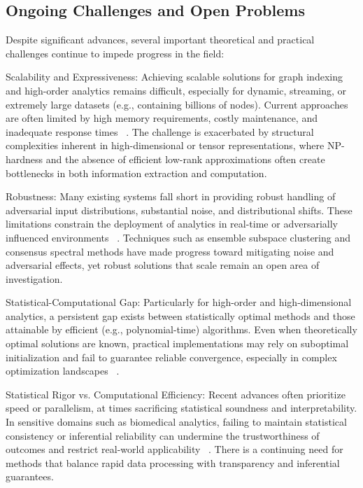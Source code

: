 \documentclass[sigconf]{acmart}
\begin{document}
\subsection{Ongoing Challenges and Open Problems}

Despite significant advances, several important theoretical and practical challenges continue to impede progress in the field:

Scalability and Expressiveness: Achieving scalable solutions for graph indexing and high-order analytics remains difficult, especially for dynamic, streaming, or extremely large datasets (e.g., containing billions of nodes). Current approaches are often limited by high memory requirements, costly maintenance, and inadequate response times ~\cite{ref104,ref107}. The challenge is exacerbated by structural complexities inherent in high-dimensional or tensor representations, where NP-hardness and the absence of efficient low-rank approximations often create bottlenecks in both information extraction and computation.

Robustness: Many existing systems fall short in providing robust handling of adversarial input distributions, substantial noise, and distributional shifts. These limitations constrain the deployment of analytics in real-time or adversarially influenced environments ~\cite{ref106}. Techniques such as ensemble subspace clustering and consensus spectral methods have made progress toward mitigating noise and adversarial effects, yet robust solutions that scale remain an open area of investigation.

Statistical-Computational Gap: Particularly for high-order and high-dimensional analytics, a persistent gap exists between statistically optimal methods and those attainable by efficient (e.g., polynomial-time) algorithms. Even when theoretically optimal solutions are known, practical implementations may rely on suboptimal initialization and fail to guarantee reliable convergence, especially in complex optimization landscapes ~\cite{ref104,ref110}.

Statistical Rigor vs. Computational Efficiency: Recent advances often prioritize speed or parallelism, at times sacrificing statistical soundness and interpretability. In sensitive domains such as biomedical analytics, failing to maintain statistical consistency or inferential reliability can undermine the trustworthiness of outcomes and restrict real-world applicability ~\cite{ref110,ref116}. There is a continuing need for methods that balance rapid data processing with transparency and inferential guarantees.
\end{document}
